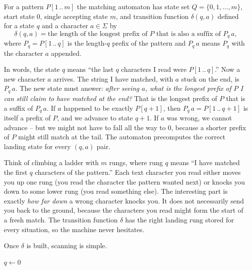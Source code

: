 \begin{definition}
\label{ch31:def-automaton}
For a pattern $P[1\,..\,m]$ the matching automaton has state set
$Q = \{0, 1, \ldots, m\}$, start state $0$, single accepting state $m$, and
transition function $\delta(q, a)$ defined for a state $q$ and a character
$a \in \Sigma$ by
\[
  \delta(q, a) = \text{the length of the longest prefix of } P
  \text{ that is also a suffix of } P_q\,a,
\]
where $P_q = P[1\,..\,q]$ is the length-$q$ prefix of the pattern and $P_q\,a$
means $P_q$ with the character $a$ appended.
\end{definition}

In words, the state
$q$ means ``the last $q$ characters I read were $P[1\,..\,q]$.'' Now a new
character $a$ arrives. The string I have matched, with $a$ stuck on the end, is
$P_q\,a$. The new state must answer: \emph{after seeing $a$, what is the longest
prefix of $P$ I can still claim to have matched at the end?} That is the
longest prefix of $P$ that is a suffix of $P_q\,a$. If $a$ happened to be exactly
$P[q+1]$, then $P_q\,a = P[1\,..\,q+1]$ is itself a prefix of $P$, and we advance
to state $q+1$. If $a$ was wrong, we cannot advance -- but we might not have to
fall all the way to $0$, because a shorter prefix of $P$ might still match at the
tail. The automaton precomputes the correct landing state for every $(q, a)$ pair.

\begin{intuitionbox}
Think of climbing a ladder with $m$ rungs, where rung $q$ means ``I have matched
the first $q$ characters of the pattern.'' Each text character you read either
moves you up one rung (you read the character the pattern wanted next) or knocks
you down to some lower rung (you read something else). The interesting part is
exactly \emph{how far down} a wrong character knocks you. It does not necessarily
send you back to the ground, because the characters you read might form the
start of a fresh match. The transition function $\delta$ has the right landing
rung stored for every situation, so the machine never hesitates.
\end{intuitionbox}

Once $\delta$ is built, scanning is simple.

\begin{algorithm}[H]
\caption{\textsc{Finite-Automaton-Matcher}}
$q \leftarrow 0$ 
\end{algorithm}

